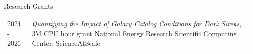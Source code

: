 \begin{rSection}{Research Grants}
\setlength{\extrarowheight}{3pt}
\begin{longtable}{p{0.1\linewidth}p{0.9\linewidth}}
    2024 - 2026 & \textit{Quantifying the Impact of Galaxy Catalog Conditions for Dark Sirens}, 3M CPU hour grant National Energy Research Scientific Computing Center, ScienceAtScale
\end{longtable}
\end{rSection}

